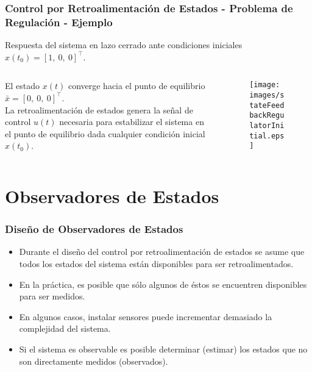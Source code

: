 \documentclass[aspectratio=169]{beamer}
\theoremstyle{definition}
\theoremstyle{plain}
\theoremstyle{remark}
\begin{document}
\begin{frame}[c]\frametitle{Control por Retroalimentación de Estados - Problema de Regulación - Ejemplo}
	\small
	Respuesta del sistema en lazo cerrado ante condiciones iniciales $x(t_0) = [1,\ 0,\ 0]^\intercal$.
	\vspace{-5mm}
	\begin{columns}
		\begin{column}{0.4\textwidth}
			El estado $x(t)$ converge hacia el punto de equilibrio $\bar{x} = [0,\ 0,\ 0]^\intercal$.\\
			\vspace{3mm}
			La retroalimentación de estados genera la señal de control $u(t)$ necesaria para estabilizar el sistema en el punto de equilibrio dada cualquier condición inicial $x(t_0)$.
		\end{column}
		\begin{column}{0.6\textwidth}
			\begin{figure}
				\centering
				\texttt{[image: images/stateFeedbackRegulatorInitial.eps]}
			\end{figure}
		\end{column}
	\end{columns}
\end{frame}

\section{Observadores de Estados}
\begin{frame}[<+->]\frametitle{Diseño de Observadores de Estados}
	\begin{itemize}
		\item Durante el diseño del control por retroalimentación de estados se asume que todos los estados del sistema están disponibles para ser retroalimentados.
		\item En la práctica, es posible que sólo algunos de éstos se encuentren disponibles para ser medidos.
		\item En algunos casos, instalar sensores puede incrementar demasiado la complejidad del sistema.
		\item Si el sistema es observable es posible determinar (estimar) los estados que no son directamente medidos (observados).
	\end{itemize}
\end{frame}
\end{document}
